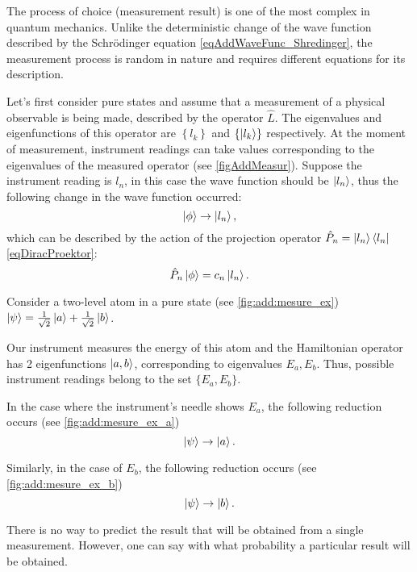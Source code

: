 The process of choice (measurement result) is one of the most complex in quantum mechanics. Unlike the deterministic change of the wave function described by the Schrödinger equation \eqref{eqAddWaveFunc_Shredinger}, the measurement process is random in nature and requires different equations for its description.



Let's first consider pure states  and assume that a measurement of a physical observable is being made, described by the operator $\hat{L}$. The eigenvalues and eigenfunctions of this operator are $\left\{ l_k \right\}$ and $\left\{ \ket{l_k} \right\}$ respectively. At the moment of measurement, instrument readings can take values corresponding to the eigenvalues of the measured operator (see \autoref{figAddMeasur}). Suppose the instrument reading is $l_n$, in this case the wave function should be $\ket{l_n}$, thus the following change in the wave function occurred:
\[
\left| \phi \right> \rightarrow \ket{l_n},
\] 
which can be described by the action of the projection operator $\hat{P}_n = \ket{l_n} \bra{l_n}$ \eqref{eqDiracProektor}:
\[
\hat{P}_n \left| \phi \right> = c_n\ket{l_n}.
\]

\begin{example}
Consider a two-level atom in a pure state (see \autoref{fig:add:mesure_ex}) 
\(
\left|\psi\right> = \frac{1}{\sqrt{2}}\ket{a}
+ \frac{1}{\sqrt{2}}\ket{b}
\).



Our instrument measures the energy of this atom and the Hamiltonian operator has 2 eigenfunctions $\ket{a,b}$, corresponding to eigenvalues $E_a, E_b$. Thus, possible instrument readings belong to the set $\{E_a, E_b\}$.



In the case where the instrument's needle shows $E_a$, the following reduction occurs (see \autoref{fig:add:mesure_ex_a})
\[
\left|\psi\right> \to \ket{a}.
\]



Similarly, in the case of $E_b$, the following reduction occurs (see \autoref{fig:add:mesure_ex_b})
\[
\left|\psi\right> \to \ket{b}.
\]
\end{example}

There is no way to predict the result that will be obtained from a single measurement. However, one can say with what probability a particular result will be obtained.


